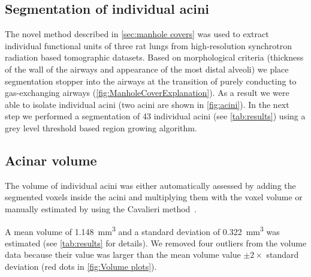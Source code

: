\documentclass[final,paper=a4,DIV=calc,abstract,english]{scrartcl}
\newcommand{\numberofacini}{43\xspace}
\newcommand{\biggerthan}{2\xspace} %
\newcommand{\meanacinarvolume}{1.148} %
\newcommand{\meanacinarvolumeSTD}{0.322} %
\begin{document}
\subsection{Segmentation of individual acini}
The novel method described in \autoref{sec:manhole covers} was used to extract individual functional units of three rat lungs from high-resolution synchrotron radiation based tomographic datasets.
Based on morphological criteria (thickness of the wall of the airways and appearance of the most distal alveoli) we place segmentation stopper into the airways at the transition of purely conducting to gas-exchanging airways (\autoref{fig:ManholeCoverExplanation}).
As a result we were able to isolate individual acini (two acini are shown in \autoref{fig:acini}).
%
In the next step we performed a segmentation of \numberofacini individual acini (see \autoref{tab:results}) using a grey level threshold based region growing algorithm.


\subsection{Acinar volume}
The volume of individual acini was either automatically assessed by adding the segmented voxels inside the acini and multiplying them with the voxel volume or manually estimated by using the Cavalieri method~.

A mean  volume of \SI{\meanacinarvolume}{\milli\meter\cubed} and a standard deviation of \SI{\meanacinarvolumeSTD}{\milli\meter\cubed} was estimated (see \autoref{tab:results} for details).
We removed four outliers from the volume data because their value was larger than the mean volume value \(\pm\biggerthan\times\) standard deviation (red dots in \autoref{fig:Volume plots}).
\end{document}
